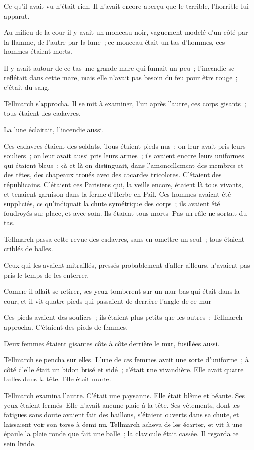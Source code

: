 \documentclass[french,twoside]{book} %
\begin{document}
Ce qu’il avait vu n’était rien. Il n’avait encore aperçu que le terrible, l’horrible lui apparut.\par
Au milieu de la cour il y avait un monceau noir, vaguement modelé d’un côté par la flamme, de l’autre par la lune ; ce monceau était un tas d’hommes, ces hommes étaient morts.\par
Il y avait autour de ce tas une grande mare qui fumait un peu ; l’incendie se reflétait dans cette mare, mais elle n’avait pas besoin du feu pour être rouge ; c’était du sang.\par
Tellmarch s’approcha. Il se mit à examiner, l’un après l’autre, ces corps gisants ; tous étaient des cadavres.\par
La lune éclairait, l’incendie aussi.\par
Ces cadavres étaient des soldats. Tous étaient pieds nus ; on leur avait pris leurs souliers ; on leur avait aussi pris leurs armes ; ils avaient encore leurs uniformes qui étaient bleus ; çà et là on distinguait, dans l’amoncellement des membres et des têtes, des chapeaux troués avec des cocardes tricolores. C’étaient des républicains. C’étaient ces Parisiens qui, la veille encore, étaient là tous vivants, et tenaient garnison dans la ferme d’Herbe-en-Pail. Ces hommes avaient été suppliciés, ce qu’indiquait la chute symétrique des corps ; ils avaient été foudroyés sur place, et avec soin. Ils étaient tous morts. Pas un râle ne sortait du tas.\par
Tellmarch passa cette revue des cadavres, sans en omettre un seul ; tous étaient criblés de balles.\par
 Ceux qui les avaient mitraillés, pressés probablement d’aller ailleurs, n’avaient pas pris le temps de les enterrer.\par
Comme il allait se retirer, ses yeux tombèrent sur un mur bas qui était dans la cour, et il vit quatre pieds qui passaient de derrière l’angle de ce mur.\par
Ces pieds avaient des souliers ; ils étaient plus petits que les autres ; Tellmarch approcha. C’étaient des pieds de femmes.\par
Deux femmes étaient gisantes côte à côte derrière le mur, fusillées aussi.\par
Tellmarch se pencha sur elles. L’une de ces femmes avait une sorte d’uniforme ; à côté d’elle était un bidon brisé et vidé ; c’était une vivandière. Elle avait quatre balles dans la tête. Elle était morte.\par
Tellmarch examina l’autre. C’était une paysanne. Elle était blême et béante. Ses yeux étaient fermés. Elle n’avait aucune plaie à la tête. Ses vêtements, dont les fatigues sans doute avaient fait des haillons, s’étaient ouverts dans sa chute, et laissaient voir son torse à demi nu. Tellmarch acheva de les écarter, et vit à une épaule la plaie ronde que fait une balle ; la clavicule était cassée. Il regarda ce sein livide.\par
\end{document}
